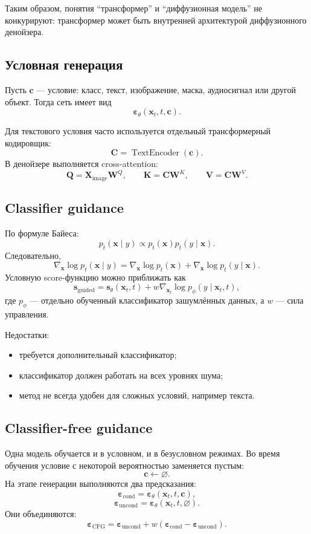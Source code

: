 \documentclass[12pt,a4paper]{article}
\theoremstyle{definition}
\newcommand{\eps}{\varepsilon}
\newcommand{\1}{\mathbf{1}}
\begin{document}
Таким образом, понятия ``трансформер'' и ``диффузионная модель'' не
конкурируют: трансформер может быть внутренней архитектурой
диффузионного денойзера.

\subsection{Условная генерация}

Пусть $\bm{c}$ --- условие: класс, текст, изображение, маска,
аудиосигнал или другой объект. Тогда сеть имеет вид
\[
    \bm{\eps}_\theta(\bm{x}_t,t,\bm{c}).
\]

Для текстового условия часто используется отдельный трансформерный
кодировщик:
\[
    \bm{C}
    =
    \operatorname{TextEncoder}(\bm{c}).
\]
В денойзере выполняется cross-attention:
\[
    \bm{Q}=\bm{X}_{\text{image}}\bm{W}^Q,
    \qquad
    \bm{K}=\bm{C}\bm{W}^K,
    \qquad
    \bm{V}=\bm{C}\bm{W}^V.
\]

\subsection{Classifier guidance}

По формуле Байеса:
\[
    p_t(\bm{x}\mid y)
    \propto
    p_t(\bm{x})p_t(y\mid\bm{x}).
\]
Следовательно,
\[
    \nabla_{\bm{x}}\log p_t(\bm{x}\mid y)
    =
    \nabla_{\bm{x}}\log p_t(\bm{x})
    +
    \nabla_{\bm{x}}\log p_t(y\mid\bm{x}).
\]
Условную score-функцию можно приближать как
\[
    \bm{s}_{\text{guided}}
    =
    \bm{s}_\theta(\bm{x}_t,t)
    +
    w\nabla_{\bm{x}_t}
    \log p_\phi(y\mid\bm{x}_t,t),
\]
где $p_\phi$ --- отдельно обученный классификатор зашумлённых данных,
а $w$ --- сила управления.

Недостатки:
\begin{itemize}
    \item требуется дополнительный классификатор;
    \item классификатор должен работать на всех уровнях шума;
    \item метод не всегда удобен для сложных условий, например текста.
\end{itemize}

\subsection{Classifier-free guidance}

Одна модель обучается и в условном, и в безусловном режимах. Во время
обучения условие с некоторой вероятностью заменяется пустым:
\[
    \bm{c}
    \leftarrow
    \varnothing.
\]
На этапе генерации выполняются два предсказания:
\[
    \bm{\eps}_{\text{cond}}
    =
    \bm{\eps}_\theta(\bm{x}_t,t,\bm{c}),
\]
\[
    \bm{\eps}_{\text{uncond}}
    =
    \bm{\eps}_\theta(\bm{x}_t,t,\varnothing).
\]
Они объединяются:
\[
    \bm{\eps}_{\text{CFG}}
    =
    \bm{\eps}_{\text{uncond}}
    +
    w
    \left(
        \bm{\eps}_{\text{cond}}
        -
        \bm{\eps}_{\text{uncond}}
    \right).
\]
\end{document}
